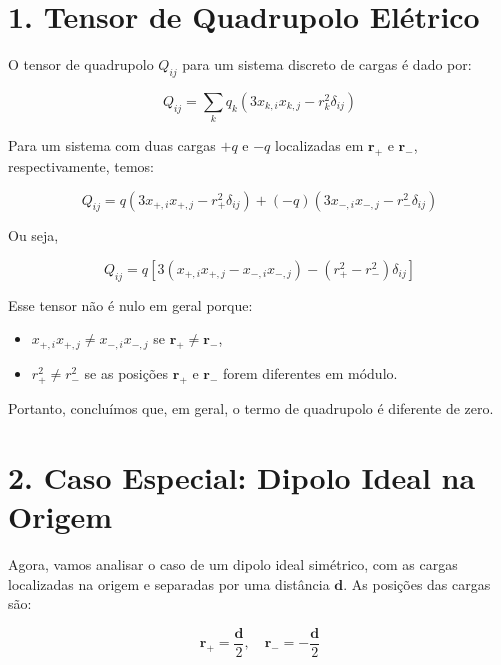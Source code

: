 \documentclass[a4paper,12pt]{article}
\begin{document}
\begin{flushleft}
\section*{1. Tensor de Quadrupolo Elétrico}

O \colorbox{pink!35}{tensor de quadrupolo \( Q_{ij} \) para um sistema discreto de cargas} é dado por:

\begin{equation}
\boxed{
Q_{ij} = \sum_k q_k \left( 3 x_{k,i} x_{k,j} - r_k^2 \delta_{ij} \right)
}
\end{equation}

Para um sistema com duas cargas \( +q \) e \( -q \) localizadas em \( \mathbf{r}_+ \) e \( \mathbf{r}_- \), respectivamente, temos:

\begin{equation}
Q_{ij} = q \left( 3 x_{+,i} x_{+,j} - r_+^2 \delta_{ij} \right) + (-q) \left( 3 x_{-,i} x_{-,j} - r_-^2 \delta_{ij} \right)
\end{equation}

Ou seja,

\begin{equation}
\boxed{Q_{ij} = q \left[ 3(x_{+,i} x_{+,j} - x_{-,i} x_{-,j}) - (r_+^2 - r_-^2)\delta_{ij} \right]}
\end{equation}

Esse \colorbox{yellow!35}{tensor não é nulo em geral} porque:

\begin{itemize}
    \item \( x_{+,i} x_{+,j} \neq x_{-,i} x_{-,j} \) se \( \mathbf{r}_+ \neq \mathbf{r}_- \),
    \item \( r_+^2 \neq r_-^2 \) se as posições \( \mathbf{r}_+ \) e \( \mathbf{r}_- \) forem diferentes em módulo.
\end{itemize}

Portanto, concluímos que, em geral, o \colorbox{red!15}{termo de quadrupolo é diferente de zero}.

\section*{2. Caso Especial: Dipolo Ideal na Origem}

Agora, vamos analisar o caso de um \colorbox{yellow!25}{dipolo ideal} simétrico, com as cargas 
localizadas na origem e separadas por uma distância \( \mathbf{d} \). As posições das cargas são:

\begin{equation}
\mathbf{r}_+ = \frac{\mathbf{d}}{2}, \quad \mathbf{r}_- = -\frac{\mathbf{d}}{2}
\end{equation}


\end{flushleft}
\end{document}
